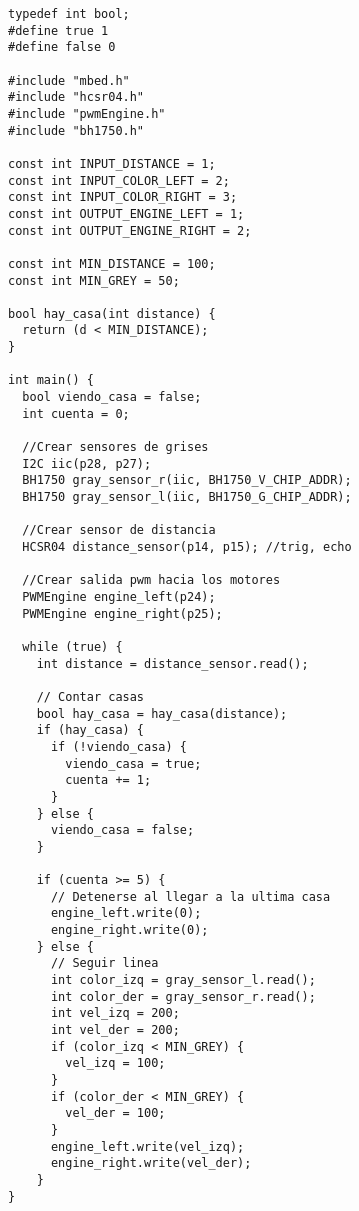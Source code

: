 \begin{verbatim}
typedef int bool;
#define true 1
#define false 0

#include "mbed.h"
#include "hcsr04.h"
#include "pwmEngine.h"
#include "bh1750.h"

const int INPUT_DISTANCE = 1;
const int INPUT_COLOR_LEFT = 2;
const int INPUT_COLOR_RIGHT = 3;
const int OUTPUT_ENGINE_LEFT = 1;
const int OUTPUT_ENGINE_RIGHT = 2;

const int MIN_DISTANCE = 100;
const int MIN_GREY = 50;

bool hay_casa(int distance) {
  return (d < MIN_DISTANCE);
}

int main() {
  bool viendo_casa = false;
  int cuenta = 0;

  //Crear sensores de grises
  I2C iic(p28, p27);
  BH1750 gray_sensor_r(iic, BH1750_V_CHIP_ADDR);
  BH1750 gray_sensor_l(iic, BH1750_G_CHIP_ADDR);

  //Crear sensor de distancia
  HCSR04 distance_sensor(p14, p15); //trig, echo

  //Crear salida pwm hacia los motores
  PWMEngine engine_left(p24);
  PWMEngine engine_right(p25);

  while (true) {
    int distance = distance_sensor.read();

    // Contar casas
    bool hay_casa = hay_casa(distance);
    if (hay_casa) {
      if (!viendo_casa) {
        viendo_casa = true;
        cuenta += 1;
      }
    } else {
      viendo_casa = false;
    }

    if (cuenta >= 5) {
      // Detenerse al llegar a la ultima casa
      engine_left.write(0);
      engine_right.write(0);
    } else {
      // Seguir linea
      int color_izq = gray_sensor_l.read();
      int color_der = gray_sensor_r.read();
      int vel_izq = 200;
      int vel_der = 200;
      if (color_izq < MIN_GREY) {
        vel_izq = 100;
      }
      if (color_der < MIN_GREY) {
        vel_der = 100;
      }
      engine_left.write(vel_izq);
      engine_right.write(vel_der);
    }
}
\end{verbatim}
